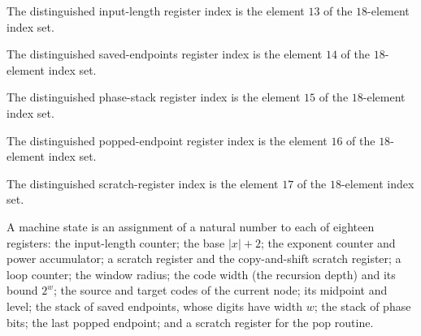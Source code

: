 \begin{definition}
\label{Complexity.LogProg.SavitchARM.rI}
\leanok
The distinguished input-length register index is the element $13$ of the $18$-element
index set.
\end{definition}

\begin{definition}
\label{Complexity.LogProg.SavitchARM.rSE}
\leanok
The distinguished saved-endpoints register index is the element $14$ of the $18$-element
index set.
\end{definition}

\begin{definition}
\label{Complexity.LogProg.SavitchARM.rSP}
\leanok
The distinguished phase-stack register index is the element $15$ of the $18$-element
index set.
\end{definition}

\begin{definition}
\label{Complexity.LogProg.SavitchARM.rE}
\leanok
The distinguished popped-endpoint register index is the element $16$ of the $18$-element
index set.
\end{definition}

\begin{definition}
\label{Complexity.LogProg.SavitchARM.rQ}
\leanok
The distinguished scratch-register index is the element $17$ of the $18$-element index
set.
\end{definition}

\begin{definition}
\label{Complexity.LogProg.SavitchARM.St}
\leanok
A machine state is an assignment of a natural number to each of eighteen registers: the
input-length counter; the base $|x|+2$; the exponent counter and power accumulator; a
scratch register and the copy-and-shift scratch register; a loop counter; the window
radius; the code width (the recursion depth) and its bound $2^w$; the source and target
codes of the current node; its midpoint and level; the stack of saved endpoints, whose
digits have width $w$; the stack of phase bits; the last popped endpoint; and a scratch
register for the pop routine.
\end{definition}

